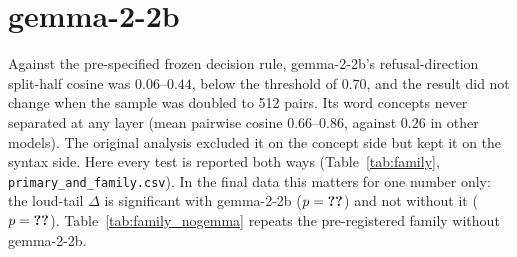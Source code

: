 \documentclass[11pt]{report}
\newcommand{\num}[1]{\ifcsname #1\endcsname\csname #1\endcsname\else\textbf{??}\fi}
\newcommand{\pval}[1]{\ifcsname #1Lt\endcsname<\else=\fi\num{#1}}
\begin{document}
\chapter{gemma-2-2b}\label{app:gemma}
Against the pre-specified frozen decision rule, gemma-2-2b's refusal-direction
split-half cosine was $0.06$--$0.44$, below the threshold of $0.70$, and the
result did not change when the sample was doubled to 512 pairs. Its word
concepts never separated at any layer (mean pairwise cosine $0.66$--$0.86$,
against $0.26$ in other models). The original analysis excluded it on the concept
side but kept it on the syntax side. Here every test is reported both ways
(Table~\ref{tab:family}, \texttt{primary\_and\_family.csv}). In the final
data this matters for one number only: the loud-tail $\Delta$ is significant
with gemma-2-2b ($p \pval{LoudFinalDeltaAllP}$) and not without it
($p \pval{LoudFinalDeltaNoGemmaP}$). Table~\ref{tab:family_nogemma} repeats the
pre-registered family without gemma-2-2b.
\end{document}
